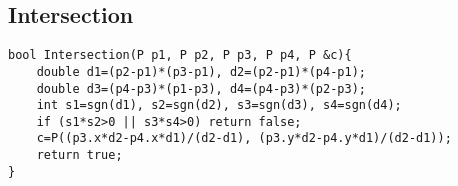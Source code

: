 \subsection{Intersection}
\begin{lstlisting}
bool Intersection(P p1, P p2, P p3, P p4, P &c){
	double d1=(p2-p1)*(p3-p1), d2=(p2-p1)*(p4-p1);
	double d3=(p4-p3)*(p1-p3), d4=(p4-p3)*(p2-p3);
	int s1=sgn(d1), s2=sgn(d2), s3=sgn(d3), s4=sgn(d4);
	if (s1*s2>0 || s3*s4>0) return false;
	c=P((p3.x*d2-p4.x*d1)/(d2-d1), (p3.y*d2-p4.y*d1)/(d2-d1));
	return true;
}
\end{lstlisting}
